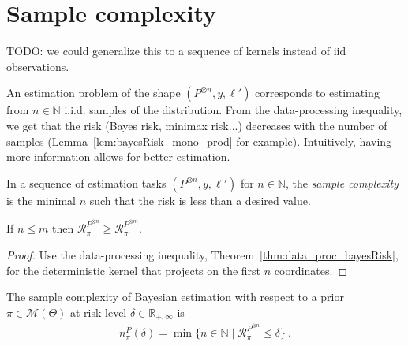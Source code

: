 \section{Sample complexity}

TODO: we could generalize this to a sequence of kernels instead of iid observations.

An estimation problem of the shape $(P^{\otimes n}, y, \ell')$ corresponds to estimating from $n \in \mathbb{N}$ i.i.d. samples of the distribution. From the data-processing inequality, we get that the risk (Bayes risk, minimax risk...) decreases with the number of samples (Lemma~\ref{lem:bayesRisk_mono_prod} for example).
Intuitively, having more information allows for better estimation.

In a sequence of estimation tasks $(P^{\otimes n}, y, \ell')$ for $n \in \mathbb{N}$, the \emph{sample complexity} is the minimal $n$ such that the risk is less than a desired value.

\begin{lemma}
  \label{lem:bayesRisk_mono_prod}
  If $n \le m$ then $\mathcal R_\pi^{P^{\otimes n}} \ge \mathcal R_\pi^{P^{\otimes m}}$.
\end{lemma}

\begin{proof}%
{}
Use the data-processing inequality, Theorem~\ref{thm:data_proc_bayesRisk}, for the deterministic kernel that projects on the first $n$ coordinates.
\end{proof}


\begin{definition}
  \label{def:priorSampleComplexity}
  The sample complexity of Bayesian estimation with respect to a prior $\pi \in \mathcal M(\Theta)$ at risk level $\delta \in \mathbb{R}_{+,\infty}$ is
  \begin{align*}
  n_\pi^P(\delta) = \min \{n \in \mathbb{N} \mid \mathcal R_\pi^{P^{\otimes n}} \le \delta\} \: .
  \end{align*}
\end{definition}
